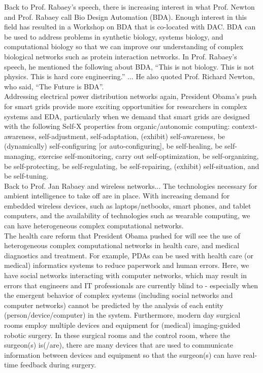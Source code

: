 Back to Prof. Rabaey's speech, there is increasing interest in what Prof. Newton and Prof. Rabaey call Bio Design Automation (BDA). Enough interest in this field has resulted in a Workshop on BDA that is co-located with DAC. BDA can be used to address problems in synthetic biology, systems biology, and computational biology so that we can improve our understanding of complex biological networks such as protein interaction networks. In Prof. Rabaey's speech, he mentioned the following about BDA, ``This is not biology. This is not physics. This is hard core engineering.'' ... He also quoted Prof. Richard Newton, who said, ``The Future is BDA''. \\

Addressing electrical power distribution networks again, President Obama's push for smart grids provide more exciting opportunities for researchers in complex systems and EDA, particularly when we demand that smart grids are designed with the following Self-X properties from organic/autonomic computing: context-awareness, self-adjustment, self-adaptation, (exhibit) self-awareness, be (dynamically) self-configuring [or auto-configuring], be self-healing, be self-managing, exercise self-monitoring, carry out self-optimization, be self-organizing, be self-protecting, be self-regulating, be self-repairing, (exhibit) self-situation, and be self-tuning. \\

Back to Prof. Jan Rabaey and wireless networks... The technologies necessary for ambient intelligence to take off are in place. With increasing demand for embedded wireless devices, such as laptops/netbooks, smart phones, and tablet computers, and the availability of technologies such as wearable computing, we can have heterogeneous complex computational networks.  \\

The health care reform that President Obama pushed for will see the use of heterogeneous complex computational networks in health care, and medical diagnostics and treatment. For example, PDAs can be used with health care (or medical) informatics systems to reduce paperwork and human errors. Here, we have social networks interacting with computer networks, which may result in errors that engineers and IT professionals are currently blind to - especially when the emergent behavior of complex systems (including social networks and computer networks) cannot be predicted by the analysis of each entity (person/device/computer) in the system. Furthermore, modern day surgical rooms employ multiple devices and equipment for (medical) imaging-guided robotic surgery. In these surgical rooms and the control room, where the surgeon(s) is(/are), there are many devices that are used to communicate information between devices and equipment so that the surgeon(s) can have real-time feedback during surgery. \\

